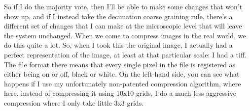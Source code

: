 \documentclass[]{article}
\begin{document}
So if I do the majority vote,
then I'll be able to make some changes
that won't show up,
and if I instead take
the decimation coarse graining rule,
there's a different set of changes
that I can make at the microscopic level
that will leave the system unchanged.
When we come to compress images
in the real world,
we do this quite a lot.
So, when I took this the original image,
I actually had a perfect
representation of the image,
at least at that particular scale:
I had a tiff.
The file format there means
that every single pixel in the file
is registered as either being
on or off, black or white.
On the left-hand side,
you can see what happens
if I use my unfortunately non-patented
compression algorithm,
where here, instead of compressing it
using 10x10 grids,
I do a much less aggressive compression
where I only take little 3x3 grids.
\end{document}
